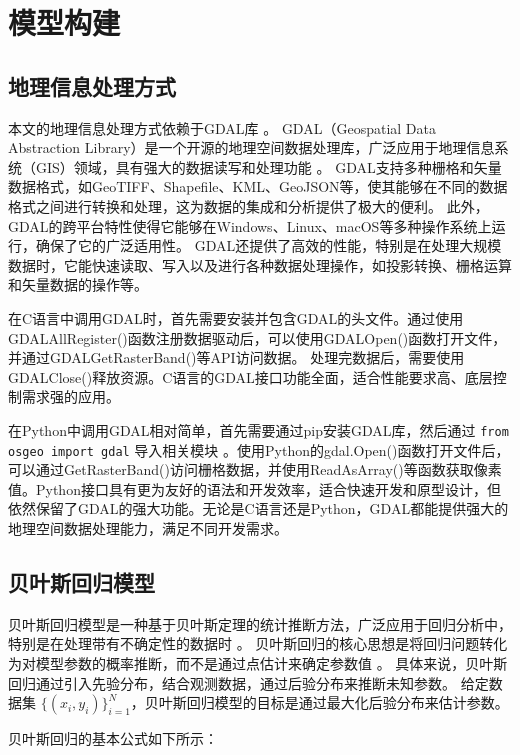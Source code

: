 \documentclass[AutoFakeBold]{LZUThesis-PgD&PhD}
\begin{document}
	\chapter{模型构建}
	
	\section{地理信息处理方式}
	
	本文的地理信息处理方式依赖于GDAL库 \cite{gdal2020}。
	GDAL（Geospatial Data Abstraction Library）是一个开源的地理空间数据处理库，广泛应用于地理信息系统（GIS）领域，具有强大的数据读写和处理功能 \cite{mitchell1999}。
	GDAL支持多种栅格和矢量数据格式，如GeoTIFF、Shapefile、KML、GeoJSON等，使其能够在不同的数据格式之间进行转换和处理，这为数据的集成和分析提供了极大的便利。
	此外，GDAL的跨平台特性使得它能够在Windows、Linux、macOS等多种操作系统上运行，确保了它的广泛适用性。
	GDAL还提供了高效的性能，特别是在处理大规模数据时，它能快速读取、写入以及进行各种数据处理操作，如投影转换、栅格运算和矢量数据的操作等。
	
	在C语言中调用GDAL时，首先需要安装并包含GDAL的头文件。通过使用GDALAllRegister()函数注册数据驱动后，可以使用GDALOpen()函数打开文件，并通过GDALGetRasterBand()等API访问数据。
	处理完数据后，需要使用GDALClose()释放资源。C语言的GDAL接口功能全面，适合性能要求高、底层控制需求强的应用。
	
	在Python中调用GDAL相对简单，首先需要通过pip安装GDAL库，然后通过 \texttt{from osgeo import gdal} 导入相关模块 \cite{osgeo}。使用Python的gdal.Open()函数打开文件后，可以通过GetRasterBand()访问栅格数据，并使用ReadAsArray()等函数获取像素值。Python接口具有更为友好的语法和开发效率，适合快速开发和原型设计，但依然保留了GDAL的强大功能。无论是C语言还是Python，GDAL都能提供强大的地理空间数据处理能力，满足不同开发需求。


	\section{贝叶斯回归模型}
	贝叶斯回归模型是一种基于贝叶斯定理的统计推断方法，广泛应用于回归分析中，特别是在处理带有不确定性的数据时 \cite{bishop2006pattern}。
	贝叶斯回归的核心思想是将回归问题转化为对模型参数的概率推断，而不是通过点估计来确定参数值 \cite{gelman2013bayesian}。
	具体来说，贝叶斯回归通过引入先验分布，结合观测数据，通过后验分布来推断未知参数。
	给定数据集 $\{(x_i, y_i)\}_{i=1}^N$，贝叶斯回归模型的目标是通过最大化后验分布来估计参数。
	
	贝叶斯回归的基本公式如下所示：
	
\end{document}
